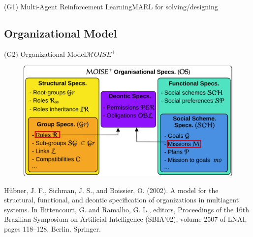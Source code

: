 \begin{frame}{(G1) Multi-Agent Reinforcement Learning}{MARL for solving/designing}
\end{frame}



\subsection{Organizational Model}

\begin{frame}{(G2) Organizational Model}{$\mathcal{M}OISE^+$}

    \begin{figure}
        \centering
        \includegraphics[width=0.75\linewidth]{figures/moise_model.png}
    \end{figure}

    \begin{spacing}{0.25}
        {\tiny Hübner, J. F., Sichman, J. S., and Boissier, O. (2002).
            A model for the structural, functional, and deontic specification of
            organizations in multiagent systems.
            In Bittencourt, G. and Ramalho, G. L., editors, Proceedings of the 16th Brazilian Symposium on Artificial Intelligence (SBIA’02), volume 2507 of LNAI, pages 118–128, Berlin. Springer.}
    \end{spacing}

\end{frame}

